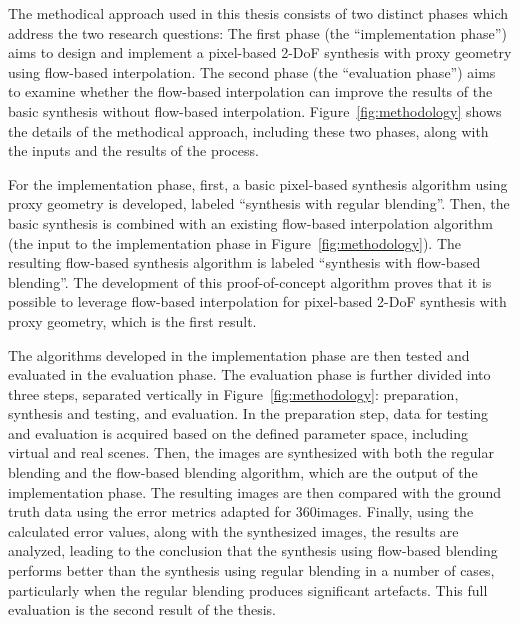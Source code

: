 The methodical approach used in this thesis consists of two distinct phases which address the two research questions: The first phase (the ``implementation phase'') aims to design and implement a pixel-based 2-DoF synthesis with proxy geometry using flow-based interpolation. The second phase (the ``evaluation phase'') aims to examine whether the flow-based interpolation can improve the results of the basic synthesis without flow-based interpolation. Figure~\ref{fig:methodology} shows the details of the methodical approach, including these two phases, along with the inputs and the results of the process.

For the implementation phase, first, a basic pixel-based synthesis algorithm using proxy geometry is developed, labeled ``synthesis with regular blending''. Then, the basic synthesis is combined with an existing flow-based interpolation algorithm (the input to the implementation phase in Figure~\ref{fig:methodology}). The resulting flow-based synthesis algorithm is labeled ``synthesis with flow-based blending''. The development of this proof-of-concept algorithm proves that it is possible to leverage flow-based interpolation for pixel-based 2-DoF synthesis with proxy geometry, which is the first result.

The algorithms developed in the implementation phase are then tested and evaluated in the evaluation phase.
The evaluation phase is further divided into three steps, separated vertically in Figure~\ref{fig:methodology}: preparation, synthesis and testing, and evaluation. In the preparation step, data for testing and evaluation is acquired based on the defined parameter space, including virtual and real scenes. Then, the images are synthesized with both the regular blending and the flow-based blending algorithm, which are the output of the implementation phase. The resulting images are then compared with the ground truth data using the error metrics adapted for 360\degree images. 
Finally, using the calculated error values, along with the synthesized images, the results are analyzed, leading to the conclusion that the synthesis using flow-based blending performs better than the synthesis using regular blending in a number of cases, particularly when the regular blending produces significant artefacts. This full evaluation is the second result of the thesis.


